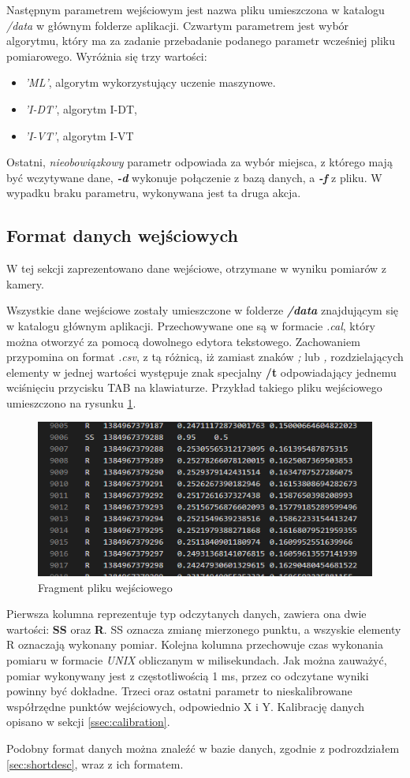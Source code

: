 Następnym parametrem wejściowym jest nazwa pliku umieszczona w katalogu \emph{/data} w głównym folderze aplikacji. Czwartym parametrem jest wybór algorytmu, który ma za zadanie przebadanie podanego parametr wcześniej pliku pomiarowego. Wyróżnia się trzy wartości:
\begin{itemize}
        \item \emph{'ML'}, algorytm wykorzystujący uczenie maszynowe.
        \item \emph{'I-DT'}, algorytm I-DT,
        \item \emph{'I-VT'}, algorytm I-VT
\end{itemize}
Ostatni, \emph{nieobowiązkowy} parametr odpowiada za wybór miejsca, z którego mają być wczytywane dane, \emph{\textbf{-d}} wykonuje połączenie z bazą danych, a \emph{\textbf{-f}} z pliku. W wypadku braku parametru, wykonywana jest ta druga akcja.
\subsection{Format danych wejściowych}
\label{ssec:importdata}
W tej sekcji zaprezentowano dane wejściowe, otrzymane w wyniku pomiarów z kamery.\par
Wszystkie dane wejściowe zostały umieszczone w folderze \emph{\textbf{/data}} znajdującym się w katalogu głównym aplikacji. Przechowywane one są w formacie \emph{.cal}, który można otworzyć za pomocą dowolnego edytora tekstowego. Zachowaniem przypomina on format \emph{.csv}, z tą różnicą, iż zamiast znaków \emph{;} lub \emph{,} rozdzielających elementy w jednej wartości występuje znak specjalny \textbf{/t} odpowiadający jednemu wciśnięciu przycisku TAB na klawiaturze. Przykład takiego pliku wejściowego umieszczono na rysunku \ref{fig:plikwejsciowy}.
\begin{figure}[H]
        \centering
        \captionsetup{justification=centering,margin=2cm}
        \includegraphics[width=0.8\linewidth]{resources/plikwejsciowy.png}
        \caption{Fragment pliku wejściowego}
        \label{fig:plikwejsciowy}
\end{figure}
Pierwsza kolumna reprezentuje typ odczytanych danych, zawiera ona dwie wartości: \textbf{SS} oraz \textbf{R}. SS oznacza zmianę mierzonego punktu, a wszyskie elementy R oznaczają wykonany pomiar. Kolejna kolumna przechowuje czas wykonania pomiaru w formacie \emph{UNIX} obliczanym w milisekundach. Jak można zauważyć, pomiar wykonywany jest z częstotliwością 1 ms, przez co odczytane wyniki powinny być dokładne. Trzeci oraz ostatni parametr to nieskalibrowane współrzędne punktów wejściowych, odpowiednio X i Y. Kalibrację danych opisano w sekcji \ref{ssec:calibration}.\par
Podobny format danych można znaleźć w bazie danych, zgodnie z podrozdziałem \ref{sec:shortdesc}, wraz z ich formatem.
